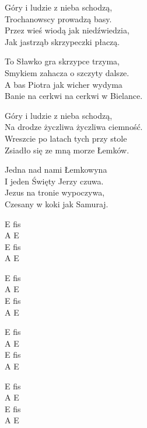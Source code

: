 \begin{text}
    Góry i ludzie z nieba schodzą,\\
    Trochanowscy prowadzą basy.\\
    Przez wieś wiodą jak niedźwiedzia,\\
    Jak jastrząb skrzypeczki płaczą.

    To Sławko gra skrzypce trzyma,\\
    Smykiem zahacza o szczyty dalsze.\\
    A bas Piotra jak wicher wydyma\\
    Banie na cerkwi na cerkwi w Bielance.

    Góry i ludzie z nieba schodzą,\\
    Na drodze życzliwa życzliwa ciemność.\\
    Wreszcie po latach tych przy stole\\
    Zsiadło się ze mną morze Łemków.

    Jedna nad nami Łemkowyna\\
    I jeden Święty Jerzy czuwa.\\
    Jezus na tronie wypoczywa,\\
    Czesany w koki jak Samuraj.

\end{text}
\begin{chord}
    E fis\\
    A E\\
    E fis\\
    A E

    E fis\\
    A E\\
    E fis\\
    A E

    E fis\\
    A E\\
    E fis\\
    A E

    E fis\\
    A E\\
    E fis\\
    A E
\end{chord}